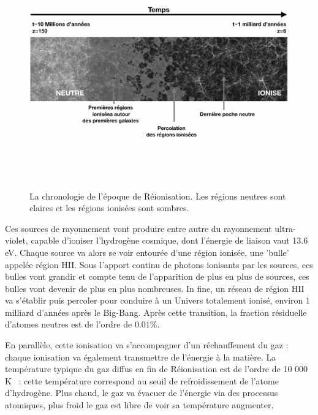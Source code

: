 \begin{figure}[htbp]
	\centering
		\includegraphics[height=10cm]{figs/frisereion.png}
		\caption[Chronologie de la Réionisation]{La chronologie de l'époque de Réionisation. Les régions neutres sont claires et les régions ionisées sont sombres.}
	\label{f:frisereion}
\end{figure}

Ces sources de rayonnement vont produire entre autre du rayonnement ultra-violet, capable d'ioniser l'hydrogène cosmique, dont l'énergie de liaison vaut 13.6 eV. Chaque source va alors se voir entourée d'une région ionisée, une 'bulle' appelée région HII. Sous l'apport continu de photons ionisants par les sources, ces bulles vont grandir et compte tenu de l'apparition de plus en plus de sources, ces bulles vont devenir de plus en plus nombreuses. In fine, un réseau de région HII va s'établir puis percoler pour conduire à un Univers totalement ionisé, environ 1 milliard d'années après le Big-Bang. Après cette transition, la fraction résiduelle d'atomes neutres est de l'ordre de $0.01\%$.

En parallèle, cette ionisation va s'accompagner d'un réchauffement du gaz : chaque ionisation va également transmettre de l'énergie à la matière. La température typique du gaz diffus en fin de Réionisation est de l'ordre de 10 000 K ~: cette température correspond au seuil de refroidissement de l'atome d'hydrogène. Plus chaud, le gaz va évacuer de l'énergie via des processus atomiques, plus froid le gaz est libre de voir sa température augmenter.

